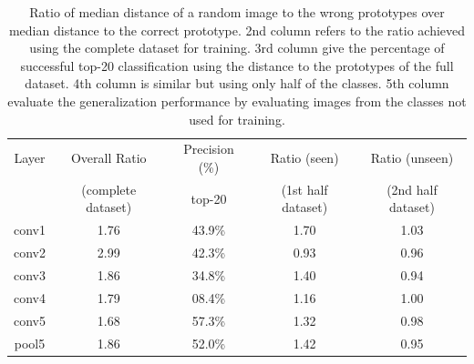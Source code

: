 \begin{table}[htb]
\centering
\small
\begin{tabular}{|c|c|c||c|c|}
  \hline
  Layer & Overall Ratio & Precision (\%) & Ratio (seen)  & Ratio (unseen) \\
  & (complete dataset) & top-20 & (1st half dataset) & (2nd half dataset) \\
  \hline
  conv1 & 1.76 & 43.9\% & 1.70 & 1.03 \\ 
  conv2 & 2.99 & 42.3\% & 0.93 & 0.96 \\ 
  conv3 & 1.86 & 34.8\% & 1.40 & 0.94 \\ 
  conv4 & 1.79 & 08.4\% & 1.16 & 1.00 \\ 
  conv5 & 1.68 & 57.3\% & 1.32 & 0.98 \\ 
  pool5 & 1.86 & 52.0\% & 1.42 & 0.95 \\ 
  \hline
\end{tabular}
\caption{Ratio of median distance of a random image to the wrong prototypes over median distance to the correct prototype. 2nd column refers to the ratio achieved using the complete dataset for training. 3rd column give the percentage of successful top-20 classification using the distance to the prototypes of the full dataset. 4th column is similar but using only half of the classes. 5th column evaluate the generalization performance by evaluating images from the classes not used for training. }
\label{fulltrainvalues}
\end{table}

